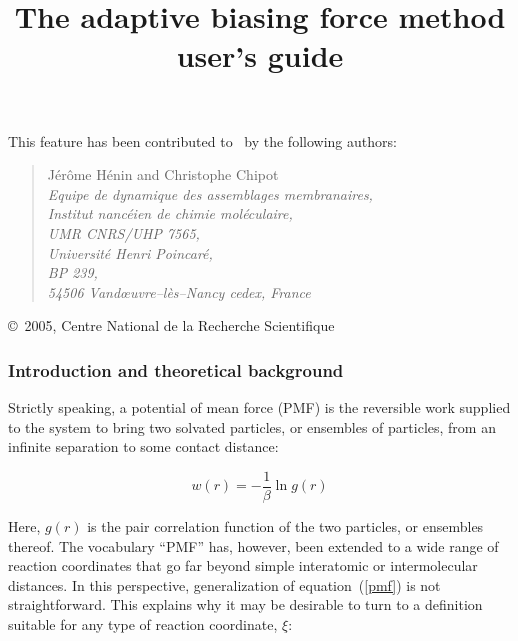 



\title{The adaptive biasing force method user's guide}

This feature has been contributed to \NAMD\ by the following authors:

\begin{quote}
   J\'er\^ome H\'enin and Christophe Chipot           \\[0.4cm]
   {\it Equipe de dynamique des assemblages membranaires, }\\
   {\it Institut nanc\'eien de chimie mol\'eculaire,      }\\
   {\it UMR CNRS/UHP 7565,                                }\\
   {\it Universit\'e Henri Poincar\'e,                    }\\
   {\it BP 239,                                           }\\
   {\it 54506 Vand\oe uvre--l\`es--Nancy cedex, France    }
\end{quote}

\copyright~2005, {\sc Centre National de la Recherche Scientifique}





\subsubsection{Introduction and theoretical background}


Strictly speaking, a potential of mean force (PMF) is the
reversible work supplied to the system to bring two solvated
particles, or ensembles of particles, from an infinite separation
to some contact distance:~\cite{chan_87_1}


\begin{equation}
\label{pmf}
w(r) = -\frac{1}{\beta} \ln g(r)
\end{equation}


Here, $g(r)$ is the pair correlation function of the
two particles, or ensembles thereof.
The vocabulary ``PMF'' has, however, been extended
to a wide range of reaction coordinates that go far
beyond simple interatomic or intermolecular distances.
In this perspective, generalization of equation~({\ref{pmf}})
is not straightforward. This explains why it may be
desirable to turn to a definition suitable for any
type of reaction coordinate, $\xi$:



